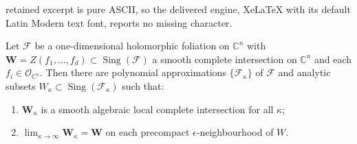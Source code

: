 \documentclass[10pt,a4paper]{amsart}
\DeclareMathOperator{\sing}{Sing}
\newcommand{\C}{\mathbb{C}}
\newcommand{\F}{\mathcal{F}}
\newcommand{\W}{\mathbf{W}}
\newcommand{\oo}{\mathcal{O}}
\begin{document}
retained excerpt is pure ASCII, so the delivered engine, XeLaTeX with its default Latin Modern text font, reports no missing character.
\begin{theorem}\label{thm:polynomial-approximation}
Let $\F$ be a one-dimensional holomorphic foliation on $\C^n$ with
$\W=Z(f_1,\ldots,f_d)\subset\sing(\F)$ a smooth complete intersection on $\C^n$ and each $f_i\in \oo_{\C^n}$.
Then there are polynomial approximations $\{\F_\kappa\}$ of $\F$ and analytic subsets $W_\kappa\subset\sing(\F_\kappa)$ such that:
\begin{enumerate}
\item[(a)] $\W_{\kappa}$ is a smooth algebraic local complete intersection for all $\kappa$;
\item[(b)] $\displaystyle\lim_{\kappa\to \infty}\W_{\kappa}=\W$ on each precompact $\epsilon$-neighbourhood of $W$.
\end{enumerate}
\end{theorem}
\end{document}
